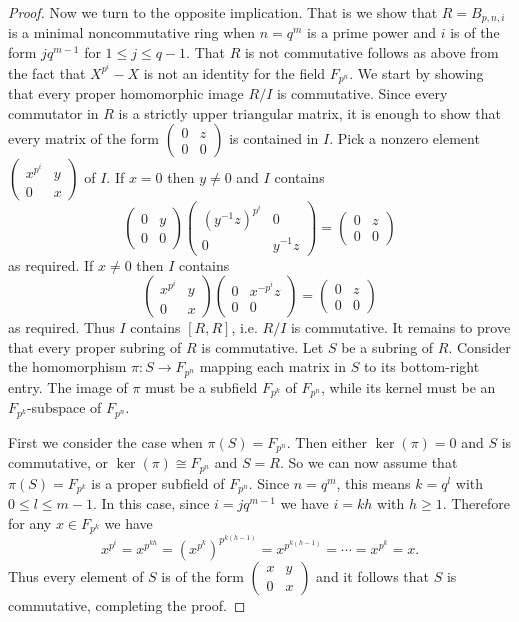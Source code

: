 \documentclass[11pt]{article}
\theoremstyle{definition}
\begin{document}
\begin{proof}
Now we turn to the opposite implication. That is we show that $R=B_{p,n,i}$ is a minimal noncommutative ring when $n=q^m$ is a prime power and $i$ is of the form $jq^{m-1}$ for $1\leq j\leq q-1$. That $R$ is not commutative follows as above from the fact that $X^{p^i}-X$ is not an identity for the field $F_{p^n}$. We start by showing that every proper homomorphic image $R/I$ is commutative. Since every commutator in $R$ is a strictly upper triangular matrix, it is enough to show that every matrix of the form $\begin{pmatrix}
0&z\\
0&0
\end{pmatrix}$ is contained in $I$. Pick a nonzero element $\begin{pmatrix}
x^{p^i}&y\\
0&x
\end{pmatrix}$ of $I$. If $x=0$ then $y\neq 0$ and $I$ contains
\[\begin{pmatrix}
0&y\\
0&0
\end{pmatrix}\begin{pmatrix}
\left(y^{-1}z\right)^{p^i}&0\\
0&y^{-1}z
\end{pmatrix}=\begin{pmatrix}
0&z\\
0&0
\end{pmatrix}\]
as required. If $x\neq 0$ then $I$ contains
\[\begin{pmatrix}
x^{p^i}&y\\
0&x
\end{pmatrix}\begin{pmatrix}
0&x^{-p^i}z\\
0&0
\end{pmatrix}=\begin{pmatrix}
0&z\\
0&0
\end{pmatrix}\]
as required. Thus $I$ contains $[R,R]$, i.e. $R/I$ is commutative. It remains to prove that every proper subring of $R$ is commutative. Let $S$ be a subring of $R$. Consider the homomorphism $\pi:S\to F_{p^n}$ mapping each matrix in $S$ to its bottom-right entry. The image of $\pi$ must be a subfield $F_{p^k}$ of $F_{p^n}$, while its kernel must be an $F_{p^k}$-subspace of $F_{p^n}$.

First we consider the case when $\pi(S)=F_{p^n}$. Then either $\ker(\pi)=0$ and $S$ is commutative, or $\ker(\pi)\cong F_{p^n}$ and $S=R$. So we can now assume that $\pi(S)=F_{p^k}$ is a proper subfield of $F_{p^n}$. Since $n=q^m$, this means $k=q^l$ with $0\leq l\leq m-1$. In this case, since $i=jq^{m-1}$ we have $i=kh$ with $h\geq 1$. Therefore for any $x\in F_{p^k}$ we have
\[x^{p^i}=x^{p^{kh}}=\left(x^{p^k}\right)^{p^{k(h-1)}}=x^{p^{k(h-1)}}=\cdots=x^{p^k}=x.\]
Thus every element of $S$ is of the form $\begin{pmatrix}
x&y\\
0&x
\end{pmatrix}$ and it follows that $S$ is commutative, completing the proof.
\end{proof}
\end{document}
